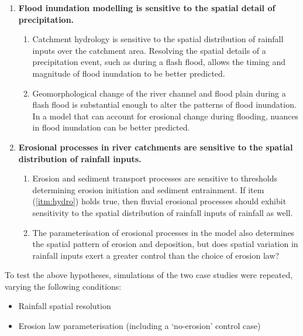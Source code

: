 \begin{enumerate}

\item \label{itm:flood} \textbf{Flood inundation modelling is sensitive to the spatial detail of precipitation.}
  \begin{enumerate} 
  \item \label{itm:hydro} Catchment hydrology is sensitive to the spatial distribution of rainfall inputs over the catchment area. Resolving the spatial details of a precipitation event, such as during a flash flood, allows the timing and magnitude of flood inundation to be better predicted.
  \item Geomorphological change of the river channel and flood plain during a flash flood is substantial enough to alter the patterns of flood inundation. In a model that can account for erosional change during flooding, nuances in flood inundation can be better predicted.
  \end{enumerate}

\item \label{itm:geomorph} \textbf{Erosional processes in river catchments are sensitive to the spatial distribution of rainfall inputs.}
  \begin{enumerate}
  \item Erosion and sediment transport processes are sensitive to thresholds determining erosion initiation and sediment entrainment. If item (\ref{itm:hydro})  holds true, then fluvial erosional processes should exhibit sensitivity to the spatial distribution of rainfall inputs of rainfall as well.
  \item The parameterisation of erosional processes in the model also determines the spatial pattern of erosion and deposition, but does spatial variation in rainfall inputs exert a greater control than the choice of erosion law?
  \end{enumerate}
  
\end{enumerate} 

To test the above hypotheses, simulations of the two case studies were repeated, varying the following conditions:

\begin{itemize}
\item Rainfall spatial resolution
\item Erosion law parameterisation (including a `no-erosion' control case)
\end{itemize}

